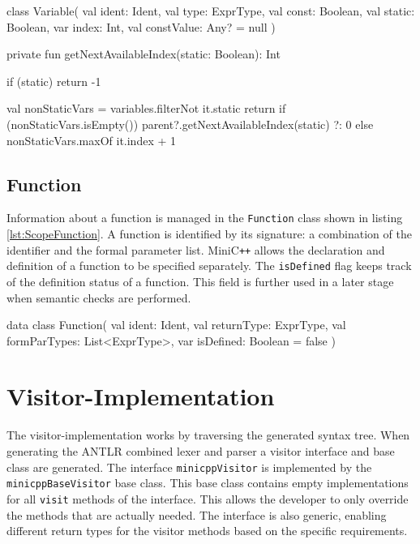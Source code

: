\begin{KotlinCode}[float,numbers=none,caption=Implementation of the \texttt{Variable} class., label=lst:ScopeVariable]
class Variable(
    val ident: Ident,
    val type: ExprType,
    val const: Boolean,
    val static: Boolean,
    var index: Int,
    val constValue: Any? = null
)
\end{KotlinCode}

\begin{KotlinCode}[float,numbers=none,caption=Implementation of the \texttt{getNextAvailableIndex} method., label=lst:ScopeVariableIndex]
private fun getNextAvailableIndex(static: Boolean): Int {
       if (static) return -1
       
       val nonStaticVars = variables.filterNot { it.static }
       return if (nonStaticVars.isEmpty()) {
           parent?.getNextAvailableIndex(static) ?: 0
       } else {
           nonStaticVars.maxOf { it.index } + 1
       }
}
\end{KotlinCode}

\subsection{Function}

Information about a function is managed in the \verb|Function| class shown in listing \ref{lst:ScopeFunction}. A function is identified by its signature: a combination of the identifier and the formal parameter list. MiniC\verb|++| allows the declaration and definition of a function to be specified separately. The \verb|isDefined| flag keeps track of the definition status of a function. This field is further used in a later stage when semantic checks are performed.  


\begin{KotlinCode}[float,numbers=none,caption=Implementation of the \texttt{Function} class., label=lst:ScopeFunction]
data class Function(
       val ident: Ident,
       val returnType: ExprType,
       val formParTypes: List<ExprType>,
       var isDefined: Boolean = false
)
\end{KotlinCode}

\section{Visitor-Implementation}

The visitor-implementation works by traversing the generated syntax tree. When generating the ANTLR combined lexer and parser a visitor interface and base class are generated. The interface \verb|minicppVisitor| is implemented by the \verb|minicppBaseVisitor| base class. This base class contains empty implementations for all \verb|visit| methods of the interface. This allows the developer to only override the methods that are actually needed. The interface is also generic, enabling different return types for the visitor methods based on the specific requirements. 

